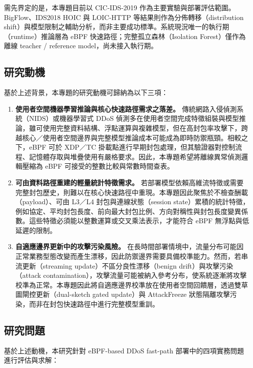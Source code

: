 \documentclass[12pt, a4paper, fontset=none]{ctexart}
\begin{document}
需先界定的是，本專題目前以 CIC-IDS-2019 作為主要實驗與部署評估範圍。BigFlow、IDS2018 HOIC 與 LOIC-HTTP 等結果則作為分佈轉移（distribution shift）與模型限制之輔助分析，而非主要成功標準。系統現況唯一的執行期（runtime）推論層為 eBPF 快速路徑；完整孤立森林（Isolation Forest）僅作為離線 teacher / reference model，尚未接入執行期。

\subsection{研究動機}
基於上述背景，本專題的研究動機可歸納為以下三項：

\begin{enumerate}
  \item \textbf{使用者空間機器學習推論與核心快速路徑需求之落差。} 傳統網路入侵偵測系統（NIDS）或機器學習式 DDoS 偵測多在使用者空間完成特徵組裝與模型推論，雖可使用完整資料結構、浮點運算與複雜模型，但在高封包率攻擊下，跨越核心／使用者空間邊界與完整模型推論成本可能成為即時防禦瓶頸。相較之下，eBPF 可於 XDP／TC 掛載點進行早期封包處理，但其驗證器對控制流程、記憶體存取與堆疊使用有嚴格要求。因此，本專題希望將離線異常偵測邏輯壓縮為 eBPF 可接受的整數比較與常數時間查表。

  \item \textbf{可由資料路徑重建的輕量統計特徵需求。} 若部署模型依賴高維流特徵或需要完整封包歷史，則難以在核心快速路徑中重現。本專題因此聚焦於不檢查酬載（payload）、可由 L3／L4 封包與連線狀態（session state）累積的統計特徵，例如協定、平均封包長度、前向最大封包比例、方向對稱性與封包長度變異係數。這些特徵必須能以整數運算或交叉乘法表示，才能符合 eBPF 無浮點與低延遲的限制。

  \item \textbf{自適應邊界更新中的攻擊污染風險。} 在長時間部署情境中，流量分布可能因正常業務型態改變而產生漂移，因此防禦邊界需要具備校準能力。然而，若串流更新（streaming update）不區分良性漂移（benign drift）與攻擊污染（attack contamination），攻擊流量可能被納入參考分布，使系統逐漸將攻擊校準為正常。本專題因此將自適應邊界校準放在使用者空間回饋層，透過雙草圖閘控更新（dual-sketch gated update）與 AttackFreeze 狀態隔離攻擊污染，而非在封包快速路徑中進行完整模型重訓。
\end{enumerate}

\subsection{研究問題}
基於上述動機，本研究針對 eBPF-based DDoS fast-path 部署中的四項實務問題進行評估與求解：
\end{document}
